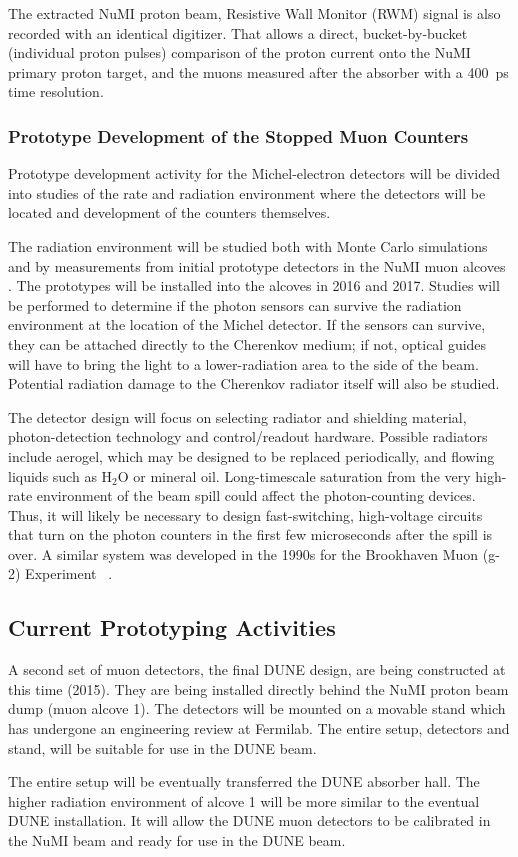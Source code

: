 The extracted NuMI proton beam, Resistive Wall Monitor (RWM) signal is
also recorded with an identical digitizer. That allows a direct,
bucket-by-bucket (individual proton pulses) comparison of the proton
current onto the NuMI primary proton target, and the muons measured
after the absorber with a 400~ps time resolution.



\subsubsection{Prototype Development of the Stopped Muon Counters}

Prototype development activity for the Michel-electron detectors will
be divided into studies of the rate and radiation environment where
the detectors will be located and development of the counters
themselves. 

The radiation environment will be studied both with Monte Carlo 
simulations and by measurements from initial prototype detectors 
in the NuMI muon alcoves \cite{ref:NuMIBeamMonitors}.
The prototypes will be installed into the alcoves in 2016 and 2017.
Studies will be performed to determine if the photon sensors
can survive the radiation environment at the location of the Michel
detector. If the sensors can survive, they can be attached directly to
the Cherenkov medium; if not, optical guides will have to bring the
light to a lower-radiation area to the side of the beam. Potential
radiation damage to the Cherenkov radiator itself will also be
studied.

The detector design will focus on selecting radiator and shielding
material, photon-detection technology and control/readout
hardware. Possible radiators include aerogel, which may be designed to
be replaced periodically, and flowing liquids such as H$_2$O or
mineral oil. Long-timescale saturation from the very high-rate
environment of the beam spill could affect the photon-counting
devices\cite{ref:HighRateCounting}. Thus, it will likely be necessary
to design fast-switching, high-voltage circuits that turn on the
photon counters in the first few microseconds after the spill is
over. A similar system was developed in the 1990s for the Brookhaven
Muon (g-2) Experiment~\cite{ref:G2} .

\subsection{Current Prototyping Activities}

A second set of muon detectors, the final DUNE design, are being
constructed at this time (2015). They are being installed directly
behind the NuMI proton beam dump (muon alcove 1). The detectors will
be mounted on a movable stand which has undergone an engineering
review at Fermilab. The entire setup, detectors and stand, will be
suitable for use in the DUNE beam.

The entire setup will be eventually transferred the DUNE absorber
hall. The higher radiation environment of alcove 1 will be more
similar to the eventual DUNE installation. It will allow the DUNE muon
detectors to be calibrated in the NuMI beam and ready for use in the
DUNE beam.
